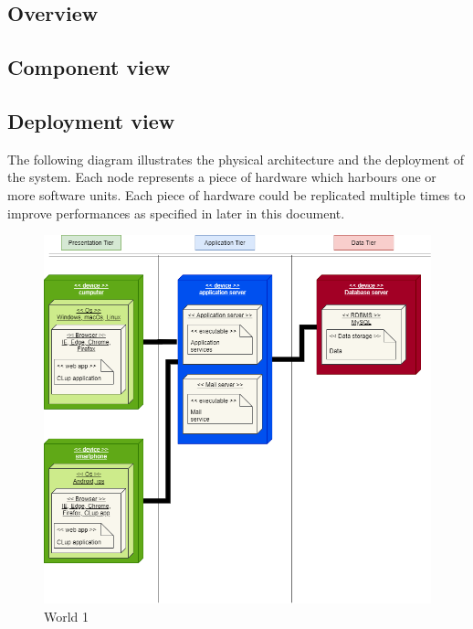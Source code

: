 \subsection{Overview}
\subsection{Component view}
\subsection{Deployment view}

The following diagram illustrates the physical architecture and the
deployment of the system.
Each node represents a piece of hardware which harbours one or more software units.
Each piece of hardware could be replicated multiple times to improve performances as  specified in later in this document.

\begin{figure}[H]
    \centering
    \hspace*{-3.5cm}
    \includegraphics[height=0.7\textwidth]{Images/TierDiagram.png}
    \caption{World 1}
\end{figure}

